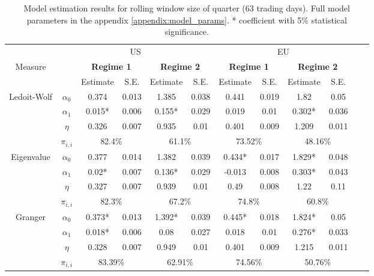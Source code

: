 \documentclass[12pt]{article}
\begin{document}
\begin{table}\small
	\begin{tabular}{cccccc | cccccc}
		& \multicolumn{5}{c}{US} & \multicolumn{4}{c}{EU} \\
		Measure &  & \multicolumn{2}{c}{\bfseries Regime 1} & \multicolumn{2}{c}{\bfseries Regime 2} & \multicolumn{2}{c}{\bfseries Regime 1} & \multicolumn{2}{c}{\bfseries Regime 2} \\
		\hline
		& & Estimate & S.E. & Estimate & S.E. & Estimate & S.E. & Estimate & S.E. \\
		\hline
		\multirow{3}{*}[\normalbaselineskip]{Ledoit-Wolf} & $\alpha_0$ & 0.374 & 0.013 & 1.385 & 0.038 & 0.441 & 0.019 & 1.82 & 0.05\\
		& $\alpha_1$ & 0.015* & 0.006 & 0.155* & 0.029 & 0.019 & 0.01 & 0.302* & 0.036\\
		& $\eta$ & 0.326 & 0.007 & 0.935 & 0.01 & 0.401 & 0.009 & 1.209 & 0.011\\
		& $\pi_{i,i}$ &  \multicolumn{2}{c}{82.4\%} & \multicolumn{2}{c|}{61.1\%} & \multicolumn{2}{c}{73.52\%} & \multicolumn{2}{c}{48.16\%}\\
		\hline
		\multirow{3}{*}[\normalbaselineskip]{Eigenvalue} & $\alpha_0$ & 0.377 & 0.014 & 1.382 & 0.039 & 0.434* & 0.017 & 1.829* & 0.048\\
		& $\alpha_1$ & 0.02* & 0.007 & 0.136* & 0.029 & -0.013 & 0.008 & 0.303* & 0.043\\
		& $\eta$ & 0.327 & 0.007 & 0.939 & 0.01 & 0.49 & 0.008 & 1.22 & 0.11\\
		& $\pi_{i,i}$ &  \multicolumn{2}{c}{82.3\%} & \multicolumn{2}{c|}{67.2\%} & \multicolumn{2}{c}{74.8\%} & \multicolumn{2}{c}{60.8\%}\\
		\hline
		\multirow{3}{*}[\normalbaselineskip]{Granger} & $\alpha_0$ & 0.373* & 0.013 & 1.392* & 0.039 & 0.445* & 0.018 & 1.824* & 0.05  \\
		& $\alpha_1$ & 0.018* & 0.006 & 0.08 & 0.027 & 0.018 & 0.01 & 0.276* & 0.033 \\
		& $\eta$ & 0.328 & 0.007 & 0.949 & 0.01 & 0.401 & 0.009 & 1.215 & 0.011\\
		& $\pi_{i,i}$ &  \multicolumn{2}{c}{83.39\%} & \multicolumn{2}{c|}{62.91\%}& \multicolumn{2}{c}{74.56\%} & \multicolumn{2}{c}{50.76\%}\\
		\hline
	\end{tabular}
	\caption{Model estimation results for rolling window size of quarter (63 trading days). Full model parameters in the appendix \ref{appendix:model_params}. * coefficient with 5\% statistical significance.}
	\label{table:model63}
\end{table}
\end{document}
